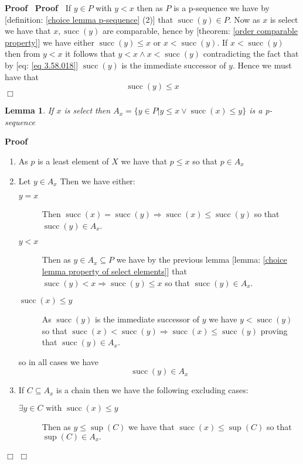 \documentclass{book}
\newcommand{\tmop}[1]{\ensuremath{\operatorname{#1}}}
\newenvironment{proof}{\noindent\textbf{Proof\ }}{\hspace*{\fill}$\Box$\medskip}
\newtheorem{lemma}{Lemma}
\begin{document}
\begin{proof}
  \begin{proof}
    If $y \in P$ with $y < x$ then as $P$ is a p-sequence we have by
    [definition: \ref{choice lemma p-sequence} (2)] that $\tmop{succ} (y) \in
    P$. Now as $x$ is select we have that $x, \tmop{succ} (y)$ are comparable,
    hence by [theorem: \ref{order comparable property}] we have either
    $\tmop{succ} (y) \leqslant x$ or $x < \tmop{succ} (y)$. If $x <
    \tmop{succ} (y)$ then from $y < x$ it follows that $y < x \wedge x <
    \tmop{succ} (y)$ contradicting the fact that by [eq: \ref{eq 3.58.018}]
    $\tmop{succ} (y)$ is the immediate successor of $y$. Hence we must have
    that
    \[ \tmop{succ} (y) \leqslant x \]
  \end{proof}
  
  \begin{lemma}
    \label{choice lemma p-sequence generation}If $x$ is select then $A_x = \{
    y \in P|y \leqslant x \vee \tmop{succ} (x) \leqslant y \}$ is a p-sequence
  \end{lemma}
  
  \begin{proof}
    
    \begin{enumerate}
      \item As $p$ is a least element of $X$ we have that $p \leqslant x$ so
      that $p \in A_x$
      
      \item Let $y \in A_x$ Then we have either:
      \begin{description}
        \item[$y = x$] Then $\tmop{succ} (x) = \tmop{succ} (y) \Rightarrow
        \tmop{succ} (x) \leqslant \tmop{succ} (y)$ so that $\tmop{succ} (y)
        \in A_x$.
        
        \item[$y < x$] Then as $y \in A_x \subseteq P$ we have by the previous
        lemma [lemma: \ref{choice lemma property of select elements}] that
        $\tmop{succ} (y) < x \Rightarrow \tmop{succ} (y) \leqslant x$ so that
        $\tmop{succ} (y) \in A_x$.
        
        \item[$\tmop{succ} (x) \leqslant y$] As $\tmop{succ} (y)$ is the
        immediate successor of $y$ we have $y < \tmop{succ} (y)$ so that
        $\tmop{succ} (x) < \tmop{succ} (y) \Rightarrow \tmop{succ} (x)
        \leqslant \tmop{succ} (y)$ proving that $\tmop{succ} (y) \in A_x$.
      \end{description}
      so in all cases we have
      \[ \tmop{succ} (y) \in A_x \]
      \item If $C \subseteq A_x$ is a chain then we have the following
      excluding cases:
      \begin{description}
        \item[$\exists y \in C \text{ with } \tmop{succ} (x) \leqslant y$]
        Then as $y \leqslant \sup (C)$ we have that $\tmop{succ} (x) \leqslant
        \sup (C)$ so that $\sup (C) \in A_x .$
        

\end{description}
\end{enumerate}
\end{proof}
\end{proof}
\end{document}

